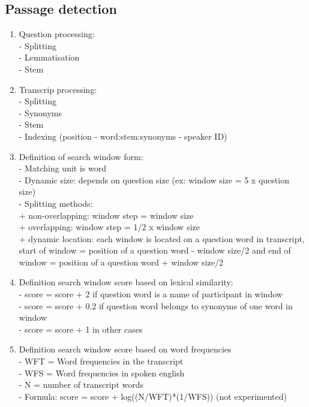 \documentclass[10pt,a4paper]{article}
\begin{document}
\subsection{Passage detection}
\begin{enumerate}
\item {Question processing: \\
			- Splitting\\
			- Lemmatisation\\
			- Stem}
\item {Transcrip processing: \\
		- Splitting \\
		- Synonyms \\
		- Stem \\
		- Indexing (position - word:stem:synonyms - speaker ID)}

\item {Definition of search window form: \\
			- Matching unit is word\\
			- Dynamic size: depends on question size (ex:  window size = 5 x question size)\\
			- Splitting methods: \\
					+  non-overlapping: window step = window size\\
					+  overlapping: window step = 1/2 x window size \\
					+  dynamic location: each window is located on a question word in transcript, start of window = position of a question word - window size/2 and end of window = position of a question word + window size/2}


\item {Definition search window score based on lexical similarity: \\
				-   score = score + 2 if question word is a name of participant in window \\
				-   score = score + 0.2 if question word belongs to synonyms of one word in window\\
				-   score = score + 1 in other cases\\}

\item {Definition search window score based on word frequencies \\
	- WFT = Word frequencies in the transcript \\
	- WFS = Word frequencies in spoken english \\
	- N = number of transcript words \\
	- Formula: score = score + log((N/WFT)*(1/WFS)) (not experimented)}


\end{enumerate}
\end{document}
